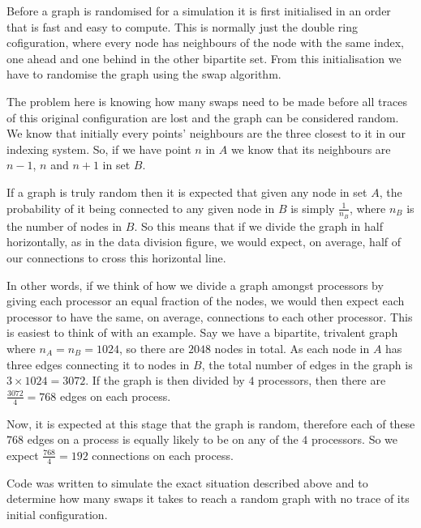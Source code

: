 \documentclass[pdftex,12pt,a4paper]{article}
\begin{document}
Before a graph is randomised for a simulation it is first initialised in an order that is fast and easy to compute. This is normally just the double ring cofiguration, where every node has neighbours of the node with the same index, one ahead and one behind in the other bipartite set. From this initialisation we have to randomise the graph using the swap algorithm.

The problem here is knowing how many swaps need to be made before all traces of this original configuration are lost and the graph can be considered random. We know that initially every points' neighbours are the three closest to it in our indexing system. So, if we have point $n$ in $A$ we know that its neighbours are $n-1$, $n$ and $n+1$ in set $B$.

If a graph is truly random then it is expected that given any node in set $A$, the probability of it being connected to any given node in $B$ is simply $\frac{1}{n_B}$, where $n_B$ is the number of nodes in $B$. So this means that if we divide the graph in half horizontally, as in the data division figure, we would expect, on average, half of our connections to cross this horizontal line.

In other words, if we think of how we divide a graph amongst processors by giving each processor an equal fraction of the nodes, we would then expect each processor to have the same, on average, connections to each other processor. This is easiest to think of with an example. Say we have a bipartite, trivalent graph where $n_A = n_B = 1024$, so there are $2048$ nodes in total. As each node in $A$ has three edges connecting it to nodes in $B$, the total number of edges in the graph is $3 \times 1024 = 3072$. If the graph is then divided by $4$ processors, then there are $\frac{3072}{4} = 768$ edges on each process.

Now, it is expected at this stage that the graph is random, therefore each of these $768$ edges on a process is equally likely to be on any of the $4$ processors. So we expect $\frac{768}{4} = 192$ connections on each process.

Code was written to simulate the exact situation described above and to determine how many swaps it takes to reach a random graph with no trace of its initial configuration.
\end{document}

